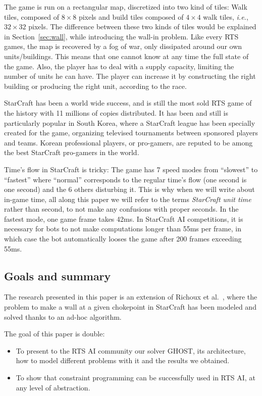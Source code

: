\documentclass[journal]{IEEEtran}
\newcommand{\ghost}{\textsc{GHOST}\xspace}
\newcommand{\ie}{\textit{i.e.}}
\begin{document}
The game  is run on  a rectangular map,  discretized into two  kind of
tiles: Walk  tiles, composed of  $8 \times  8$ pixels and  build tiles
composed of $4  \times 4$ walk tiles, \ie, $32  \times 32$ pixels. The
difference  between these  two kinds  of tiles  would be  explained in
Section~\ref{sec:wall},  while introducing  the wall-in  problem. Like
every RTS games, the map is recovered by a fog of war, only dissipated
around our own units/buildings. This means that one cannot know at any
time the full state of the game.   Also, the player has to deal with a
supply capacity, limiting the number of  units he can have. The player
can increase  it by constructing  the right building or  producing the
right unit, according to the race.

StarCraft has  been a world wide  success, and is still  the most sold
RTS game of the history with 11 millions of copies distributed. It has
been  and  still is  particularly  popular  in  South Korea,  where  a
StarCraft league has  been specially created for  the game, organizing
televised  tournaments between  sponsored players  and teams.   Korean
professional players, or pro-gamers, are  reputed to be among the best
StarCraft pro-gamers in the world.

Time's flow  in StarCraft is tricky:  The game has 7  speed modes from
``slowest'' to ``fastest'' where ``normal'' corresponds to the regular
time's flow  (one second is  one second)  and the 6  others disturbing
it. This is why when we will  write about in-game time, all along this
paper we will refer to the terms {\it StarCraft unit time} rather than
second, to not make any confusions with proper seconds. In the fastest
mode, one game  frame takes 42ms. In StarCraft AI  competitions, it is
necessary  for bots  to not  make  computations longer  than 55ms  per
frame, in which  case the bot automatically looses the  game after 200
frames exceeding 55ms.

\subsection{Goals and summary}

The research  presented in this  paper is  an extension of  Richoux et
al.~\cite{RichouxUO14}, where  the problem to  make a wall at  a given
chokepoint  in StarCraft  has been  modeled  and solved  thanks to  an
ad-hoc algorithm.

The goal of this paper is double:
\begin{itemize}
\item  To present  to  the RTS  AI community  our  solver \ghost,  its
  architecture,  how  to model  different  problems  with it  and  the
  results we obtained.
\item To show that constraint  programming can be successfully used in
  RTS AI, at any level of abstraction.
\end{itemize}
\end{document}
